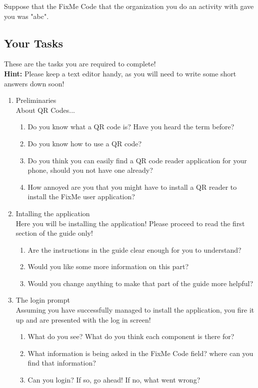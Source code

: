 \documentclass[12pt]{article}
\begin{document}
Suppose that the FixMe Code that the organization you do an activity with gave you was "abc".

\pagebreak
\subsection{Your Tasks}
These are the tasks you are required to complete! \\
\textbf{Hint:} Please keep a text editor handy, as you will need to write some short answers down soon!
\begin{enumerate}

\item Preliminaries\\
About QR Codes...
\begin{enumerate}
\item Do you know what a QR code is? Have you heard the term before?
\item Do you know how to use a QR code?
\item Do you think you can easily find a QR code reader application for your phone, should you not have one already?
\item How annoyed are you that you might have to install a QR reader to install the FixMe user application?
\end{enumerate}

\item Intalling the application\\
Here you will be installing the application! Please proceed to read the first section of the guide only!
\begin{enumerate}
\item Are the instructions in the guide clear enough for you to understand?
\item Would you like some more information on this part?
\item Would you change anything to make that part of the guide more helpful?
\end{enumerate}

\item The login prompt\\
Assuming you have successfully managed to install the application, you fire it up and are presented with the log in screen!
\begin{enumerate}
\item What do you see? What do you think each component is there for?
\item What information is being asked in the FixMe Code field? where can you find that information?
\item Can you login? If so, go ahead! If no, what went wrong?
\end{enumerate}


\end{enumerate}
\end{document}

